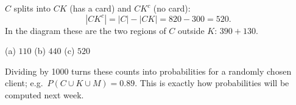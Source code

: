 \begin{solution}
	 $C$ splits into $CK$ (has a card) and $CK^c$ (no card):
	\[ |CK^c|=|C|-|CK|=820-300=520. \]
	In the diagram these are the two regions of $C$ outside $K$: $390+130$.
	\begin{answer}
		(a) $110$ \quad (b) $440$ \quad (c) $520$
	\end{answer}
	\begin{remark}
		Dividing by 1000 turns these counts into probabilities for a randomly
		chosen client; e.g.\ $P(C\cup K\cup M)=0.89$. This is exactly how
		probabilities will be computed next week.
	\end{remark}
\end{solution}
